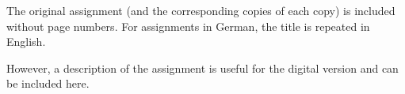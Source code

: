The original assignment (and the corresponding copies of each copy) is included without page numbers. For assignments in German, the title is repeated in English.

However, a description of the assignment is useful for the digital version and can be included here.